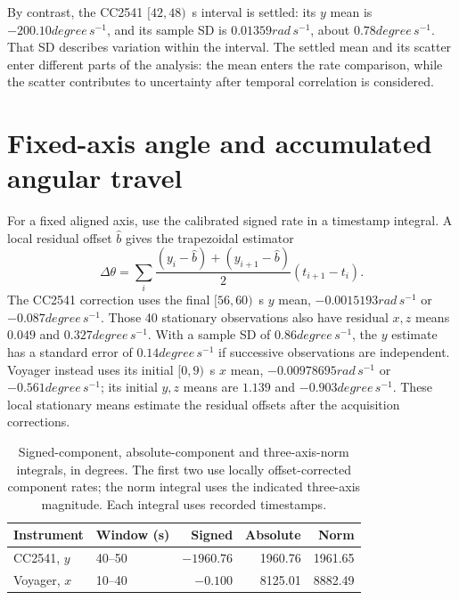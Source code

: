 By contrast, the CC2541 $[42,48)$~s interval is settled: its $y$ mean is $-200.10\unit{degree\,s^{-1}}$, and its sample SD is $0.01359\unit{rad\,s^{-1}}$, about $0.78\unit{degree\,s^{-1}}$. That SD describes variation within the interval. The settled mean and its scatter enter different parts of the analysis: the mean enters the rate comparison, while the scatter contributes to uncertainty after temporal correlation is considered.

\section{Fixed-axis angle and accumulated angular travel}
\label{sec:gyro-integral}
For a fixed aligned axis, use the calibrated signed rate in a timestamp integral. A local residual offset $\widehat b$ gives the trapezoidal estimator
\begin{equation}
 \Delta\theta=\sum_i\frac{(y_i-\widehat b)+(y_{i+1}-\widehat b)}{2}
 (t_{i+1}-t_i).
 \label{eq:gyro-integral}
\end{equation}
The CC2541 correction uses the final $[56,60)$~s $y$ mean, $-0.0015193\unit{rad\,s^{-1}}$ or $-0.087\unit{degree\,s^{-1}}$. Those 40 stationary observations also have residual $x,z$ means $0.049$ and $0.327\unit{degree\,s^{-1}}$. With a sample SD of $0.86\unit{degree\,s^{-1}}$, the $y$ estimate has a standard error of $0.14\unit{degree\,s^{-1}}$ if successive observations are independent. Voyager instead uses its initial $[0,9)$~s $x$ mean, $-0.00978695\unit{rad\,s^{-1}}$ or $-0.561\unit{degree\,s^{-1}}$; its initial $y,z$ means are $1.139$ and $-0.903\unit{degree\,s^{-1}}$. These local stationary means estimate the residual offsets after the acquisition corrections.

\begin{table}[t]
\caption{Signed-component, absolute-component and three-axis-norm integrals, in degrees. The first two use locally offset-corrected component rates; the norm integral uses the indicated three-axis magnitude. Each integral uses recorded timestamps.}
\label{tab:gyro-integrals}
\centering\small
\begin{tabular}{@{}llrrr@{}}
\toprule
Instrument & Window (s) & Signed & Absolute & Norm\\
\midrule
CC2541, $y$ & 40--50 & $-1960.76$ & 1960.76 & 1961.65\\
Voyager, $x$ & 10--40 & $-0.100$ & 8125.01 & 8882.49\\
\bottomrule
\end{tabular}
\end{table}

